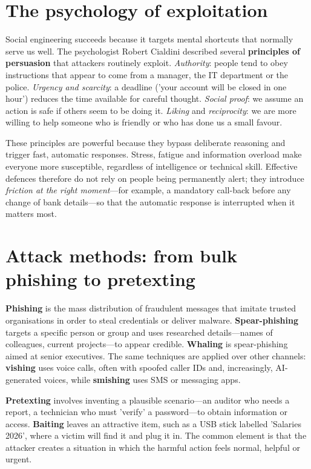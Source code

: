 \section{The psychology of exploitation}\label{sec:5.1}
Social engineering succeeds because it targets mental shortcuts that normally serve us well. The psychologist Robert Cialdini described several \textbf{principles of persuasion} that attackers routinely exploit. \emph{Authority}: people tend to obey instructions that appear to come from a manager, the IT department or the police. \emph{Urgency and scarcity}: a deadline ('your account will be closed in one hour') reduces the time available for careful thought. \emph{Social proof}: we assume an action is safe if others seem to be doing it. \emph{Liking} and \emph{reciprocity}: we are more willing to help someone who is friendly or who has done us a small favour.

These principles are powerful because they bypass deliberate reasoning and trigger fast, automatic responses. Stress, fatigue and information overload make everyone more susceptible, regardless of intelligence or technical skill. Effective defences therefore do not rely on people being permanently alert; they introduce \emph{friction at the right moment}—for example, a mandatory call-back before any change of bank details—so that the automatic response is interrupted when it matters most.

\section{Attack methods: from bulk phishing to pretexting}\label{sec:5.2}
\textbf{Phishing} is the mass distribution of fraudulent messages that imitate trusted organisations in order to steal credentials or deliver malware. \textbf{Spear-phishing} targets a specific person or group and uses researched details—names of colleagues, current projects—to appear credible. \textbf{Whaling} is spear-phishing aimed at senior executives. The same techniques are applied over other channels: \textbf{vishing} uses voice calls, often with spoofed caller IDs and, increasingly, AI-generated voices, while \textbf{smishing} uses SMS or messaging apps.

\textbf{Pretexting} involves inventing a plausible scenario—an auditor who needs a report, a technician who must 'verify' a password—to obtain information or access. \textbf{Baiting} leaves an attractive item, such as a USB stick labelled 'Salaries 2026', where a victim will find it and plug it in. The common element is that the attacker creates a situation in which the harmful action feels normal, helpful or urgent.


